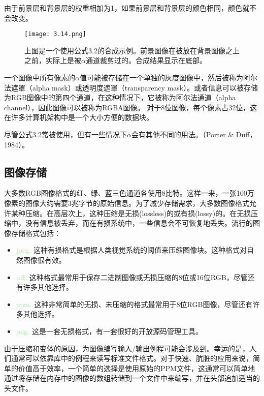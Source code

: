\documentclass[lang=cn,12pt]{elegantbook}
\begin{document}
\begin{note}
由于前景层和背景层的权重相加为1，如果前景层和背景层的颜色相同，颜色就不会改变。
\end{note}

\begin{figure}[htb]
  \centering
  \texttt{[image: 3.14.png]}
  \caption{上图是一个使用公式3.2的合成示例。前景图像在被放在背景图像之上之前，实际上是被$\alpha $通道裁剪过的。合成结果显示在底部。}
\end{figure}

一个图像中所有像素的$\alpha $值可能被存储在一个单独的灰度图像中，然后被称为阿尔法遮罩（alpha mask）或透明度遮罩（transparency mask）。或者信息可以被存储为RGB图像中的第四个通道，在这种情况下，它被称为阿尔法通道（alpha channel），因此图像可以被称为RGBA图像。
对于8位图像，每个像素占32位，这在许多计算机架构中是一个大小方便的数据块。

尽管公式3.2常被使用，但有一些情况下$\alpha $会有其他不同的用法。（Porter \& Duff，1984）。

\subsection{图像存储}

大多数RGB图像格式的红、绿、蓝三色通道各使用8比特。这样一来，一张100万像素的图像大约需要3兆字节的原始信息。为了减少存储需求，大多数图像格式允许某种压缩。在高层次上，这种压缩是无损(lossless)的或有损(lossy)的。在无损压缩中，没有信息被丢弃，而在有损系统中，一些信息会不可恢复地丢失。流行的图像存储格式包括：

\begin{itemize}
  \item \textcolor{lightgreen}{jpeg.} 这种有损格式是根据人类视觉系统的阈值来压缩图像块。这种格式对自然图像很有效。
  \item \textcolor{lightgreen}{tiff.} 这种格式最常用于保存二进制图像或无损压缩的8位或16位RGB，尽管还有许多其他选择。
  \item \textcolor{lightgreen}{ppm.} 这种非常简单的无损、未压缩的格式最常用于8位RGB图像，尽管还有许多其他选择。
  \item \textcolor{lightgreen}{png.} 这是一套无损格式，有一套很好的开放源码管理工具。
\end{itemize}

由于压缩和变体的原因，为图像编写输入/输出例程可能会涉及到。幸运的是，人们通常可以依靠库中的例程来读写标准文件格式。对于快速、肮脏的应用来说，简单的价值高于效率，一个简单的选择是使用原始的PPM文件，这通常可以简单地通过将存储在内存中的图像的数组转储到一个文件中来编写，并在头部追加适当的头文件。
\end{document}
